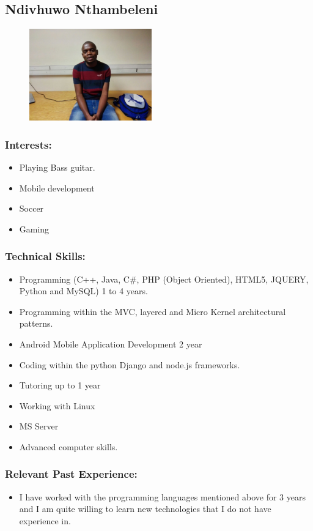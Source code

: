 \subsection{Ndivhuwo Nthambeleni}
\begin{figure}[h]
			\center
			\includegraphics[width=200px]{images/Ndivhuwo.jpg}
\end{figure}
\subsubsection{Interests:}
\begin{itemize}
		\item Playing Bass guitar.
		\item Mobile development
		\item Soccer
		\item Gaming
	\end{itemize}

\subsubsection{Technical Skills:}
\begin{itemize}
		\item Programming (C++, Java, C\#, PHP (Object Oriented), HTML5, JQUERY, Python and MySQL) 1 to 4 years.
		\item Programming within the MVC, layered and Micro Kernel architectural patterns.
		\item Android Mobile Application Development 2 year
		\item Coding within the python Django and node.js frameworks.
		\item Tutoring up to 1 year
		\item Working with Linux 
		\item MS Server
		\item Advanced computer skills.
	\end{itemize}

\subsubsection{Relevant Past Experience:}
\begin{itemize}
		\item I have worked with the programming languages mentioned above for 3 years and I am quite willing to learn new technologies that I do not have experience in.
\end{itemize}

